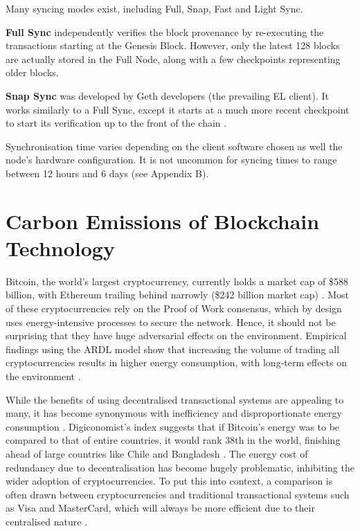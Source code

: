 Many syncing modes exist, including Full, Snap, Fast and Light Sync.

\textbf{Full Sync }independently verifies the block provenance by re-executing the transactions starting at the Genesis Block. However, only the latest 128 blocks are actually stored in the Full Node, along with a few checkpoints representing older blocks. 

\textbf{Snap Sync }was developed by Geth developers (the prevailing EL client). It works similarly to a Full Sync, except it starts at a much more recent checkpoint to start its verification up to the front of the chain \cite{2022DeveloperGo-ethereum}.

Synchronisation time varies depending on the client software chosen as well the node's hardware configuration. It is not uncommon for syncing times to range between 12 hours and 6 days (see Appendix B).



\section{Carbon Emissions of Blockchain Technology }

Bitcoin, the world's largest cryptocurrency, currently holds a market cap of \$588 billion, with Ethereum trailing behind narrowly (\$242 billion market cap) \cite{BitcoinCoinMarketCap}. Most of these cryptocurrencies rely on the Proof of Work consensus, which by design uses energy-intensive processes to secure the network. Hence, it should not be surprising that they have huge adversarial effects on the environment. Empirical findings using the ARDL model show that increasing the volume of trading all cryptocurrencies results in higher energy consumption, with long-term effects on the environment \cite{Schinckus2020Crypto-currenciesConsumption}. \newline 

While the benefits of using decentralised transactional systems are appealing to many, it has become synonymous with inefficiency and disproportionate energy consumption \cite{DeVriesBitcoinsProblem}. Digiconomist's index suggests that if Bitcoin's energy was to be compared to that of entire countries, it would rank 38th in the world, finishing ahead of large countries like Chile and Bangladesh \cite{BitcoinDigiconomist}. The energy cost of redundancy due to decentralisation has become hugely problematic, inhibiting the wider adoption of cryptocurrencies. To put this into context, a comparison is often drawn between cryptocurrencies and traditional transactional systems such as Visa and MasterCard, which will always be more efficient due to their centralised nature \cite{Kohli2023AnSolutions}.  

